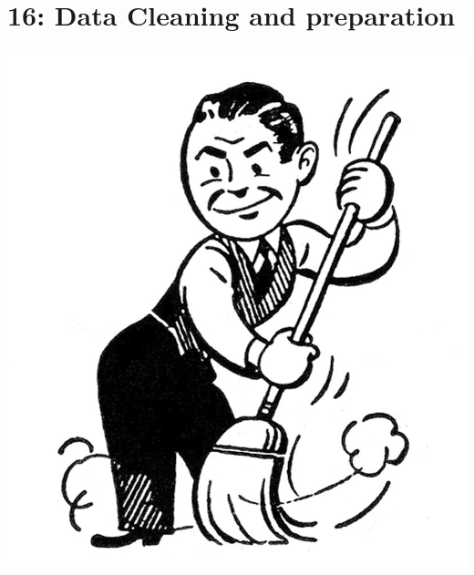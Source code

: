 \documentclass{tufte-book}\usepackage[]{graphicx}\usepackage[]{color}
\begin{document}

\chapter{16: Data Cleaning and preparation}
\label{ch:16}

\begin{marginfigure}
\includegraphics[width=\linewidth,keepaspectration]{cleaning.jpg}
\end{marginfigure}
\end{document}

